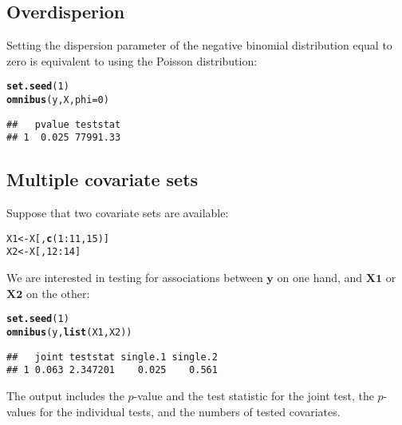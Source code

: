 \documentclass{article}\usepackage[]{graphicx}\usepackage[]{color}
\makeatletter
\newcommand{\hlnum}[1]{\textcolor[rgb]{0.686,0.059,0.569}{#1}}%
\newcommand{\hlopt}[1]{\textcolor[rgb]{0,0,0}{#1}}%
\newcommand{\hlstd}[1]{\textcolor[rgb]{0.345,0.345,0.345}{#1}}%
\newcommand{\hlkwb}[1]{\textcolor[rgb]{0.69,0.353,0.396}{#1}}%
\newcommand{\hlkwc}[1]{\textcolor[rgb]{0.333,0.667,0.333}{#1}}%
\newcommand{\hlkwd}[1]{\textcolor[rgb]{0.737,0.353,0.396}{\textbf{#1}}}%
\newenvironment{kframe}{%
 \def\at@end@of@kframe{}%
 \ifinner\ifhmode%
  \def\at@end@of@kframe{\end{minipage}}%
  \begin{minipage}{\columnwidth}%
 \fi\fi%
 \def\FrameCommand##1{\hskip\@totalleftmargin \hskip-\fboxsep
 \colorbox{shadecolor}{##1}\hskip-\fboxsep
     \hskip-\linewidth \hskip-\@totalleftmargin \hskip\columnwidth}%
 \MakeFramed {\advance\hsize-\width
   \@totalleftmargin\z@ \linewidth\hsize
   \@setminipage}}%
 {\par\unskip\endMakeFramed%
 \at@end@of@kframe}
\newenvironment{knitrout}{}{} %
\makeatother
\begin{document}
\newpage

\subsection{Overdisperion}
\label{TOA Overdispersion}

Setting the dispersion parameter of the negative binomial distribution equal to zero is equivalent to using the Poisson distribution:
\begin{knitrout}
\color{fgcolor}\begin{kframe}
\begin{alltt}
\hlkwd{set.seed}\hlstd{(}\hlnum{1}\hlstd{)}
\hlkwd{omnibus}\hlstd{(y,X,}\hlkwc{phi}\hlstd{=}\hlnum{0}\hlstd{)}
\end{alltt}
\begin{verbatim}
##   pvalue teststat
## 1  0.025 77991.33
\end{verbatim}
\end{kframe}
\end{knitrout}

\subsection{Multiple covariate sets}
\label{TOA Multiple covariate sets}

Suppose that two covariate sets are available:
\begin{knitrout}
\color{fgcolor}\begin{kframe}
\begin{alltt}
\hlstd{X1} \hlkwb{<-} \hlstd{X[,}\hlkwd{c}\hlstd{(}\hlnum{1}\hlopt{:}\hlnum{11}\hlstd{,}\hlnum{15}\hlstd{)]}
\hlstd{X2} \hlkwb{<-} \hlstd{X[,}\hlnum{12}\hlopt{:}\hlnum{14}\hlstd{]}
\end{alltt}
\end{kframe}
\end{knitrout}

We are interested in testing for associations between $\boldsymbol{y}$ on one hand, and $\boldsymbol{X1}$ or $\boldsymbol{X2}$ on the other:
\begin{knitrout}
\color{fgcolor}\begin{kframe}
\begin{alltt}
\hlkwd{set.seed}\hlstd{(}\hlnum{1}\hlstd{)}
\hlkwd{omnibus}\hlstd{(y,}\hlkwd{list}\hlstd{(X1,X2))}
\end{alltt}
\begin{verbatim}
##   joint teststat single.1 single.2
## 1 0.063 2.347201    0.025    0.561
\end{verbatim}
\end{kframe}
\end{knitrout}
The output includes the \mbox{$p$-value} and the test statistic for the joint test, the \mbox{$p$-values} for the individual tests, and the numbers of tested covariates.
\end{document}
